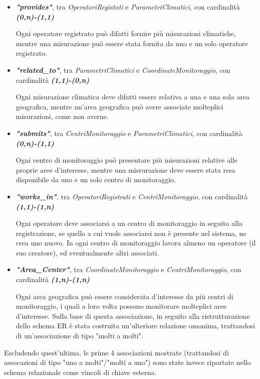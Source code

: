 \begin{itemize}
	\item \textbf{\textit{"provides"}}, tra \textit{OperatoriRegistati} e \textit{ParametriClimatici}, con cardinalità \textbf{\textit{(0,n)-(1,1)}}
	      
	      Ogni operatore registrato può difatti fornire più misurazioni climatiche, mentre una misurazione può essere stata fornita da uno e un solo operatore registrato.
	\item \textbf{\textit{"related\_to"}}, tra \textit{ParametriClimatici} e \textit{CoordinateMonitoraggio}, con cardinalità \textbf{\textit{(1,1)-(0,n)}}
	      
	      Ogni misurazione climatica deve difatti essere relativa a una e una sola area geografica, mentre un'area geografica può avere associate molteplici misurazioni, come non averne.
	\item \textbf{\textit{"submits"}}, tra \textit{CentriMonitoraggio} e \textit{ParametriClimatici}, con cardinalità \textbf{\textit{(0,n)-(1,1)}}
	      
	      Ogni centro di monitoraggio può presentare più misurazioni relative alle proprie aree d'interesse, mentre una misrurazione deve essere stata resa disponibile da uno e un solo centro di monitoraggio.
	\item \textbf{\textit{"works\_in"}}, tra \textit{OperatoriRegistrati} e \textit{CentriMonitoraggio}, con cardinalità \textbf{\textit{(1,1)-(1,n)}}
	      
	      Ogni operatore deve associarsi a un centro di monitoraggio in seguito alla registrazione, se quello a cui vuole associarsi non è presente nel sistema, ne crea uno nuovo. In ogni centro di monitoraggio lavora almeno un operatore (il suo creatore), ed eventualmente altri associati.
	\item \textbf{\textit{"Area\_Center"}}, tra \textit{CoordinateMonitoraggio} e \textit{CentriMonitoraggio}, con cardinalità \textbf{\textit{(1,n)-(1,n)}}
	      
	      Ogni area geografica può essere considerata d'interesse da più centri di monitoraggio, i quali a loro volta possono monitorare molteplici aree d'interesse.
	      Sulla base di questa associazione, in seguito alla ristrutturazione dello schema ER è stata costruita un'ulteriore relazione omonima, trattandosi di un'associazione di tipo "molti a molti".
\end{itemize}
Escludendo quest'ultima, le prime 4 associazioni mostrate (trattandosi di assocazioni di tipo "uno a molti"/"molti a uno") sono state invece riportate nello schema relazionale come vincoli di chiave esterna.
\pagebreak

